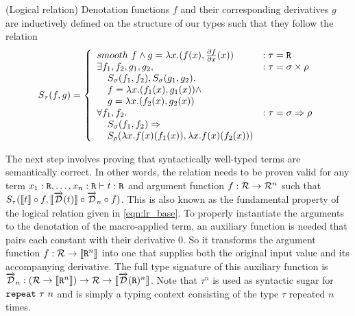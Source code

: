   \begin{definition}(Logical relation)
    Denotation functions $f$ and their corresponding derivatives $g$ are inductively defined on the structure of our types such that they follow the relation
    \begin{equation*}
      S_\tau(f, g) =
        \left\{
          \begin{array}{ll}
            smooth\ f \wedge
              g = \lambda x. (f(x), \frac{\partial f}{\partial x}(x))
              & : \tau = \texttt{R} \\
            \exists f_1, f_2, g_1, g_2,
              & : \tau = \sigma \times \rho \\
              \;\;\;\;S_\sigma(f_1, f_2), S_\sigma(g_1, g_2). \\
              \;\;\;\;f = \lambda x. (f_1(x), g_1(x)) \wedge \\
              \;\;\;\;g = \lambda x. (f_2(x), g_2(x)) \\
            \forall f_1, f_2.
              & : \tau = \sigma \Rightarrow \rho \\
              \;\;\;\;S_\sigma(f_1, f_2) \Rightarrow \\
              \;\;\;\;S_\rho(\lambda x. f(x)(f_1(x)),\lambda x. f(x)(f_2(x)))
          \end{array}
        \right.
    \label{eqn:lr_base}
    \end{equation*}
  \end{definition}

  The next step involves proving that syntactically well-typed terms are semantically correct.
  In other words, the relation needs to be proven valid for any term $x_1 : \texttt{R}, \dots, x_n : \texttt{R} \vdash t : \texttt{R}$ and argument function $f : \mathcal{R} \rightarrow \mathcal{R}^n$ such that $S_\tau(\llbracket t \rrbracket \circ f, \llbracket \overrightarrow{\mathcal{D}}(t) \rrbracket \circ \overrightarrow{\mathcal{D}}_n \circ f)$.
  This is also known as the fundamental property of the logical relation given in \cref{eqn:lr_base}.
  To properly instantiate the arguments to the denotation of the macro-applied term, an auxiliary function is needed that pairs each constant with their derivative $0$. So it transforms the argument function $f : \mathcal{R} \rightarrow \llbracket \texttt{R}^n \rrbracket$ into one that supplies both the original input value and its accompanying derivative.
  The full type signature of this auxiliary function is $\overrightarrow{\mathcal{D}}_n : (\mathcal{R} \rightarrow \llbracket \texttt{R}^n \rrbracket) \rightarrow \mathcal{R} \rightarrow \llbracket \overrightarrow{\mathcal{D}}(\texttt{R})^n \rrbracket$. Note that $\tau^n$ is used as syntactic sugar for $\texttt{repeat}\ \tau\ n$ and is simply a typing context consisting of the type $\tau$ repeated $n$ times.

